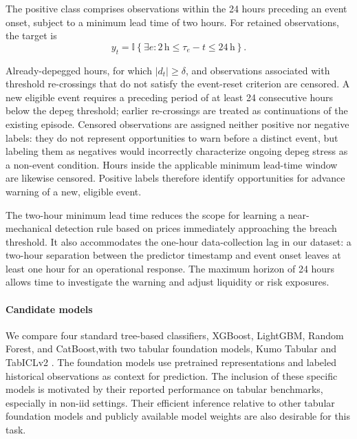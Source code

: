 \documentclass[a4paper,fleqn]{cas-sc}
\begin{document}
The positive class comprises observations within the 24 hours preceding an event onset, subject to a minimum lead time of two hours. For retained observations, the target is
\begin{equation}
    y_t =
    \mathbb{I}\!\left\{
        \exists e:
        2\,\mathrm{h} \leq \tau_e-t \leq 24\,\mathrm{h}
    \right\}.
    \label{eq:early_warning_target}
\end{equation}

Already-depegged hours, for which $|d_t|\geq\delta$, and observations associated with threshold re-crossings that do not satisfy the event-reset criterion are censored. A new eligible event requires a preceding period of at least 24 consecutive hours below the depeg threshold; earlier re-crossings are treated as continuations of the existing episode. Censored observations are assigned neither positive nor negative labels: they do not represent opportunities to warn before a distinct event, but labeling them as negatives would incorrectly characterize ongoing depeg stress as a non-event condition. Hours inside the applicable minimum lead-time window are likewise censored. Positive labels therefore identify opportunities for advance warning of a new, eligible event.

The two-hour minimum lead time reduces the scope for learning a near-mechanical detection rule based on prices immediately approaching the breach threshold. It also accommodates the one-hour data-collection lag in our dataset: a two-hour separation between the predictor timestamp and event onset leaves at least one hour for an operational response. The maximum horizon of 24 hours allows time to investigate the warning and adjust liquidity or risk exposures.

\paragraph{Candidate models}

We compare four standard tree-based classifiers, XGBoost, LightGBM, Random Forest, and CatBoost,with two tabular foundation models, Kumo Tabular and TabICLv2 \cite{kumo2026tabular,qu2026tabiclv2}. The foundation models use pretrained representations and labeled historical observations as context for prediction. The inclusion of these specific models is motivated by their reported performance on tabular benchmarks, especially in non-iid settings. Their efficient inference relative to other tabular foundation models and publicly available model weights are also desirable for this task.
\end{document}
